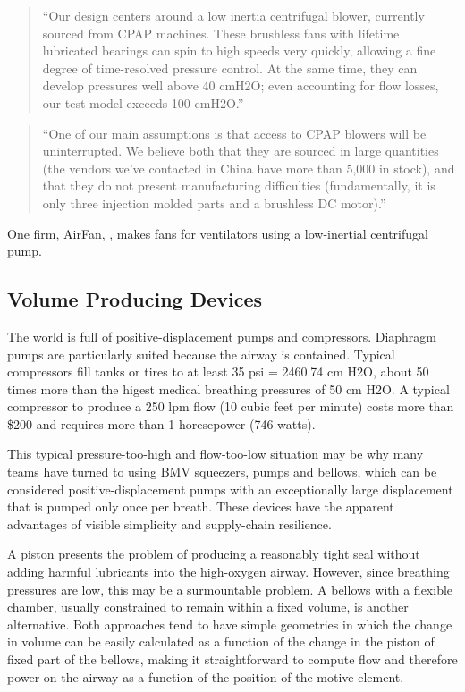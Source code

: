 \documentclass[conference]{article}
\begin{document}
\begin{quote}
  ``Our design centers around a low inertia centrifugal blower, currently sourced from CPAP machines. These brushless fans with lifetime lubricated bearings can spin to high speeds very quickly, allowing a fine degree of time-resolved pressure control. At the same time, they can develop pressures well above 40 cmH2O; even accounting for flow losses, our test model exceeds 100 cmH2O.''
\end{quote}

\begin{quote}
  ``One of our main assumptions is that access to CPAP blowers will be uninterrupted. We believe both that they are sourced in large quantities (the vendors we’ve contacted in China have more than 5,000 in stock), and that they do not present manufacturing difficulties (fundamentally, it is only three injection molded parts and a brushless DC motor).''
\end{quote}

One firm, AirFan, \cite{AirFan}, makes fans for ventilators using a low-inertial centrifugal pump.

\subsection{Volume Producing Devices}

The world is full of positive-displacement pumps and compressors. Diaphragm pumps are particularly suited because
the airway is contained. Typical compressors fill tanks or tires to at least 35 psi = 2460.74 cm H2O,
about 50 times more than the higest medical breathing pressures of 50 cm H2O. A typical compressor to produce a 250 lpm
flow (10 cubic feet per minute) costs more than \$200 and requires more than 1 horesepower (746 watts).

This typical pressure-too-high and flow-too-low situation may be why
many teams have turned to using BMV squeezers, pumps and bellows,
which can be considered positive-displacement pumps with an exceptionally
large displacement that is pumped only once per breath.
These devices have the apparent advantages of visible simplicity and
supply-chain resilience.

A piston presents the problem of producing a reasonably tight seal
without adding harmful lubricants into the high-oxygen airway.
However, since breathing pressures are low, this may be a surmountable problem.
A bellows with a flexible chamber, usually constrained
to remain within a fixed volume, is another alternative.  Both approaches tend to have simple geometries in which the
change in volume can be easily calculated as a function of the change in the piston of fixed part of the bellows, making
it straightforward to compute flow and therefore power-on-the-airway as a function of the position of the motive element.
\end{document}
